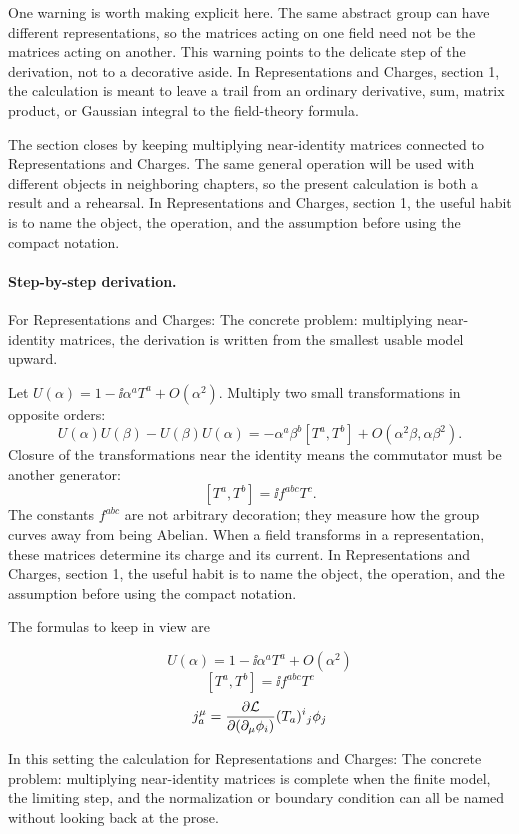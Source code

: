 One warning is worth making explicit here.  The same abstract group can have different representations, so the matrices acting on one field need not be the matrices acting on another.  This warning points to the delicate step of the derivation, not to a decorative aside.  In Representations and Charges, section 1, the calculation is meant to leave a trail from an ordinary derivative, sum, matrix product, or Gaussian integral to the field-theory formula.

The section closes by keeping multiplying near-identity matrices connected to Representations and Charges.  The same general operation will be used with different objects in neighboring chapters, so the present calculation is both a result and a rehearsal.  In Representations and Charges, section 1, the useful habit is to name the object, the operation, and the assumption before using the compact notation.



\paragraph{Step-by-step derivation.}

For Representations and Charges: The concrete problem: multiplying near-identity matrices, the derivation is written from the smallest usable model upward.

Let \(U(\alpha)=1-\ii\alpha^aT^a+O(\alpha^2)\).  Multiply two small transformations in opposite orders:
\[
  U(\alpha)U(\beta)-U(\beta)U(\alpha)
  =
  -\alpha^a\beta^b[T^a,T^b]+O(\alpha^2\beta,\alpha\beta^2).
\]
Closure of the transformations near the identity means the commutator must be another generator:
\[
  [T^a,T^b]=\ii f^{abc}T^c.
\]
The constants \(f^{abc}\) are not arbitrary decoration; they measure how the group curves away from being Abelian.  When a field transforms in a representation, these matrices determine its charge and its current.  In Representations and Charges, section 1, the useful habit is to name the object, the operation, and the assumption before using the compact notation.

The formulas to keep in view are

\[
  U(\alpha)=1-\ii\alpha^aT^a+O(\alpha^2)
\]
\[
  [T^a,T^b]=\ii f^{abc}T^c
\]
\[
  j^\mu_a=\frac{\partial\mathcal L}{\partial(\partial_\mu\phi_i)}(T_a)^i{}_j\phi_j
\]

In this setting the calculation for Representations and Charges: The concrete problem: multiplying near-identity matrices is complete when the finite model, the limiting step, and the normalization or boundary condition can all be named without looking back at the prose.




